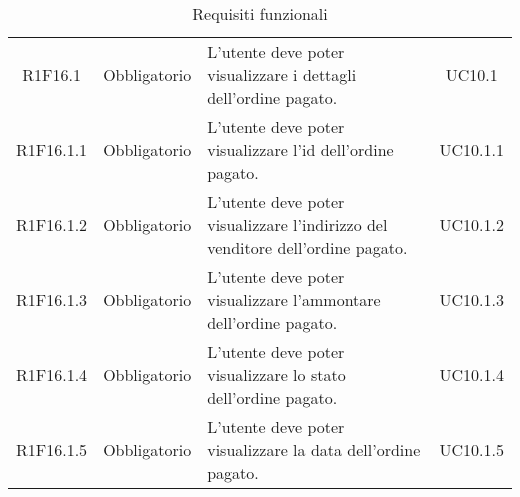 \begin{table}[H]
\begin{tabular}{c | c | p{6cm} | c}
        R1F16.1                                                           & Obbligatorio & L'utente deve poter visualizzare i dettagli dell'ordine pagato.                                                              & UC10.1   \\
        R1F16.1.1                                                         & Obbligatorio & L'utente deve poter visualizzare l'id dell'ordine pagato.                                                                    & UC10.1.1 \\
        R1F16.1.2                                                         & Obbligatorio & L'utente deve poter visualizzare l'indirizzo del venditore dell'ordine pagato.                                               & UC10.1.2 \\
        R1F16.1.3                                                         & Obbligatorio & L'utente deve poter visualizzare l'ammontare dell'ordine pagato.                                                             & UC10.1.3 \\
        R1F16.1.4                                                         & Obbligatorio & L'utente deve poter visualizzare lo stato dell'ordine pagato.                                                                & UC10.1.4 \\
        R1F16.1.5                                                         & Obbligatorio & L'utente deve poter visualizzare la data dell'ordine pagato.                                                                 & UC10.1.5 \\
    \end{tabular}
    \caption{Requisiti funzionali}
\end{table}

